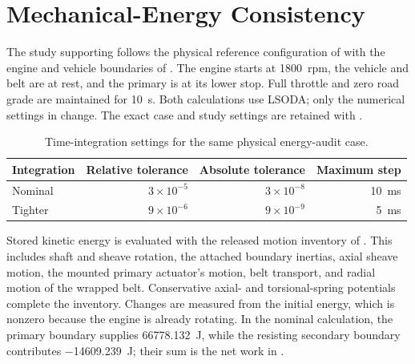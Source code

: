 \documentclass[11pt]{report}
\numberwithin{equation}{section}
\begin{document}
\section{Mechanical-Energy Consistency}
\label{app:study_energy_consistency}

The study supporting  follows the
physical reference configuration of 
with the engine and vehicle boundaries of
. The engine
starts at \SI{1800}{rpm}, the vehicle and belt are at rest, and the primary
is at its lower stop. Full throttle and zero road grade are maintained for
\SI{10}{s}. Both calculations use LSODA; only the numerical settings in
 change. The exact case and study settings are
retained with
.

\begin{table}[H]
  \centering\small
  \begin{tabular}{@{}lrrr@{}}
    \toprule
    Integration & Relative tolerance & Absolute tolerance & Maximum step \\
    \midrule
    Nominal & \(3\times10^{-5}\) & \(3\times10^{-8}\) & \SI{10}{ms} \\
    Tighter & \(9\times10^{-6}\) & \(9\times10^{-9}\) & \SI{5}{ms} \\
    \bottomrule
  \end{tabular}
  \caption{Time-integration settings for the same physical energy-audit case.}
  \label{tab:energy_study_numerics}
\end{table}

Stored kinetic energy is evaluated with the released motion inventory of
.
This includes shaft and sheave rotation, the attached boundary inertias,
axial sheave motion, the mounted primary actuator's motion, belt transport,
and radial motion of the wrapped belt. Conservative axial- and
torsional-spring potentials complete the inventory. Changes are measured
from the initial energy, which is nonzero because the engine is already
rotating. In the nominal calculation, the primary boundary supplies
\SI{66778.132}{J}, while the resisting secondary boundary contributes
\SI{-14609.239}{J}; their sum is the net work in
.
\end{document}
